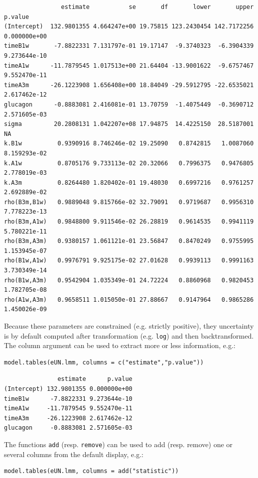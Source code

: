 \documentclass[12pt]{article}
\begin{document}
\begin{verbatim}
                estimate           se       df       lower       upper      p.value
(Intercept)  132.9801355 4.664247e+00 19.75815 123.2430454 142.7172256 0.000000e+00
timeB1w       -7.8822331 7.131797e-01 19.17147  -9.3740323  -6.3904339 9.273644e-10
timeA1w      -11.7879545 1.017513e+00 21.64404 -13.9001622  -9.6757467 9.552470e-11
timeA3m      -26.1223908 1.656408e+00 18.84049 -29.5912795 -22.6535021 2.617462e-12
glucagon      -0.8883081 2.416081e-01 13.70759  -1.4075449  -0.3690712 2.571605e-03
sigma         20.2808131 1.042207e+08 17.94875  14.4225150  28.5187001           NA
k.B1w          0.9390916 8.746246e-02 19.25090   0.8742815   1.0087060 8.159293e-02
k.A1w          0.8705176 9.733113e-02 20.32066   0.7996375   0.9476805 2.778019e-03
k.A3m          0.8264480 1.820402e-01 19.48030   0.6997216   0.9761257 2.692889e-02
rho(B3m,B1w)   0.9889048 9.815766e-02 32.79091   0.9719687   0.9956310 7.778223e-13
rho(B3m,A1w)   0.9848800 9.911546e-02 26.28819   0.9614535   0.9941119 5.780221e-11
rho(B3m,A3m)   0.9380157 1.061121e-01 23.56847   0.8470249   0.9755995 1.153945e-07
rho(B1w,A1w)   0.9976791 9.925175e-02 27.01628   0.9939113   0.9991163 3.730349e-14
rho(B1w,A3m)   0.9542904 1.035349e-01 24.72224   0.8860968   0.9820453 1.782705e-08
rho(A1w,A3m)   0.9658511 1.015050e-01 27.88667   0.9147964   0.9865286 1.450026e-09
\end{verbatim}

Because these parameters are constrained (e.g. strictly positive),
they uncertainty is by default computed after transformation
(e.g. \texttt{log}) and then backtransformed. The column argument can be used
to extract more or less information, e.g.:
\lstset{language=r,label= ,caption= ,captionpos=b,numbers=none}
\begin{lstlisting}
model.tables(eUN.lmm, columns = c("estimate","p.value"))
\end{lstlisting}

\begin{verbatim}
               estimate      p.value
(Intercept) 132.9801355 0.000000e+00
timeB1w      -7.8822331 9.273644e-10
timeA1w     -11.7879545 9.552470e-11
timeA3m     -26.1223908 2.617462e-12
glucagon     -0.8883081 2.571605e-03
\end{verbatim}


The functions \texttt{add} (resp. \texttt{remove}) can be used to add (resp. remove)
one or several columns from the default display, e.g.:
\lstset{language=r,label= ,caption= ,captionpos=b,numbers=none}
\begin{lstlisting}
model.tables(eUN.lmm, columns = add("statistic"))
\end{lstlisting}
\end{document}
